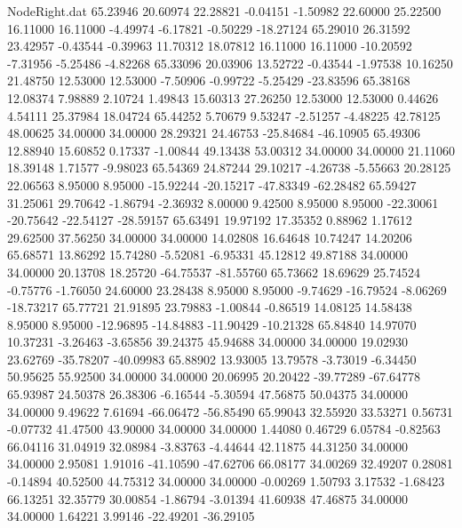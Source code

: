 \begin{filecontents}{NodeRight.dat}
  65.23946   20.60974   22.28821    -0.04151   -1.50982   22.60000   25.22500   16.11000   16.11000   -4.49974   -6.17821   -0.50229  -18.27124
  65.29010   26.31592   23.42957    -0.43544   -0.39963   11.70312   18.07812   16.11000   16.11000  -10.20592   -7.31956   -5.25486   -4.82268
  65.33096   20.03906   13.52722    -0.43544   -1.97538   10.16250   21.48750   12.53000   12.53000   -7.50906   -0.99722   -5.25429  -23.83596
  65.38168   12.08374    7.98889     2.10724    1.49843   15.60313   27.26250   12.53000   12.53000    0.44626    4.54111   25.37984   18.04724
  65.44252    5.70679    9.53247    -2.51257   -4.48225   42.78125   48.00625   34.00000   34.00000   28.29321   24.46753  -25.84684  -46.10905
  65.49306   12.88940   15.60852     0.17337   -1.00844   49.13438   53.00312   34.00000   34.00000   21.11060   18.39148    1.71577   -9.98023
  65.54369   24.87244   29.10217    -4.26738   -5.55663   20.28125   22.06563    8.95000    8.95000  -15.92244  -20.15217  -47.83349  -62.28482
  65.59427   31.25061   29.70642    -1.86794   -2.36932    8.00000    9.42500    8.95000    8.95000  -22.30061  -20.75642  -22.54127  -28.59157
  65.63491   19.97192   17.35352     0.88962    1.17612   29.62500   37.56250   34.00000   34.00000   14.02808   16.64648   10.74247   14.20206
  65.68571   13.86292   15.74280    -5.52081   -6.95331   45.12812   49.87188   34.00000   34.00000   20.13708   18.25720  -64.75537  -81.55760
  65.73662   18.69629   25.74524    -0.75776   -1.76050   24.60000   23.28438    8.95000    8.95000   -9.74629  -16.79524   -8.06269  -18.73217
  65.77721   21.91895   23.79883    -1.00844   -0.86519   14.08125   14.58438    8.95000    8.95000  -12.96895  -14.84883  -11.90429  -10.21328
  65.84840   14.97070   10.37231    -3.26463   -3.65856   39.24375   45.94688   34.00000   34.00000   19.02930   23.62769  -35.78207  -40.09983
  65.88902   13.93005   13.79578    -3.73019   -6.34450   50.95625   55.92500   34.00000   34.00000   20.06995   20.20422  -39.77289  -67.64778
  65.93987   24.50378   26.38306    -6.16544   -5.30594   47.56875   50.04375   34.00000   34.00000    9.49622    7.61694  -66.06472  -56.85490
  65.99043   32.55920   33.53271     0.56731   -0.07732   41.47500   43.90000   34.00000   34.00000    1.44080    0.46729    6.05784   -0.82563
  66.04116   31.04919   32.08984    -3.83763   -4.44644   42.11875   44.31250   34.00000   34.00000    2.95081    1.91016  -41.10590  -47.62706
  66.08177   34.00269   32.49207     0.28081   -0.14894   40.52500   44.75312   34.00000   34.00000   -0.00269    1.50793    3.17532   -1.68423
  66.13251   32.35779   30.00854    -1.86794   -3.01394   41.60938   47.46875   34.00000   34.00000    1.64221    3.99146  -22.49201  -36.29105

\end{filecontents}
